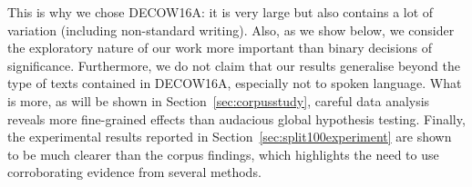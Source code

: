 This is why we chose DECOW16A: it is very large but also contains a lot of variation (including non-standard writing).
Also, as we show below, we consider the exploratory nature of our work more important than binary decisions of significance.
Furthermore, we do not claim that our results generalise beyond the type of texts contained in DECOW16A, especially not to spoken language.
What is more, as will be shown in Section~\ref{sec:corpusstudy}, careful data analysis reveals more fine-grained effects than audacious global hypothesis testing.
Finally, the experimental results reported in Section~\ref{sec:split100experiment} are shown to be much clearer than the corpus findings, which highlights the need to use corroborating evidence from several methods.
